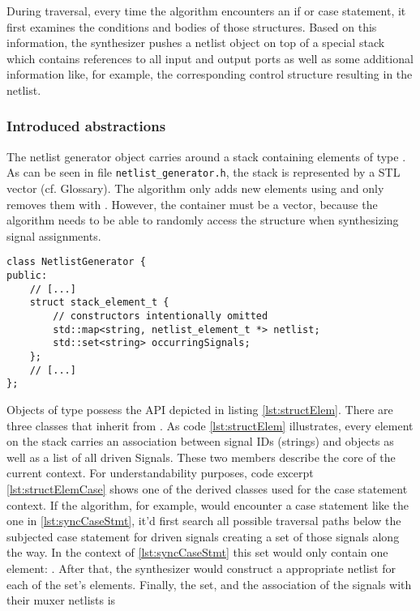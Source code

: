 During traversal, every time the algorithm encounters an if or
case statement, it first examines the conditions and bodies of those
structures. Based on this information, the synthesizer pushes a netlist
object on top of a special stack which contains references to all
input and output ports as well as some additional information like,
for example, the corresponding control structure resulting in the
netlist.

\subsubsection{Introduced abstractions}
The netlist generator object carries around a stack containing
elements of type . As can be seen in file
\texttt{netlist_generator.h},
the stack is represented by a STL vector (cf. Glossary).
The algorithm only adds new elements using  and only
removes them with . However, the container must be a
vector, because the algorithm needs to be able to randomly access the
structure when synthesizing signal assignments.
%
\begin{lstlisting}[style=c++, caption={API of base stack element},
    label={lst:structElem}]
class NetlistGenerator {
public:
    // [...]
    struct stack_element_t {
        // constructors intentionally omitted
        std::map<string, netlist_element_t *> netlist;
        std::set<string> occurringSignals;
    };
    // [...]
};
\end{lstlisting}
%
Objects of type  possess the API depicted in
listing \ref{lst:structElem}. There are three classes that inherit
from . As code \ref{lst:structElem} illustrates,
every element on the stack carries an association between signal IDs
(strings) and  objects as well as a list of all
driven Signals. These two members describe the core of the current
context.
For understandability purposes, code excerpt \ref{lst:structElemCase}
shows one of the derived classes used for the case statement
context. If the algorithm, for example, would encounter a case
statement like the one in \ref{lst:syncCaseStmt}, it'd first search
all possible traversal paths below the subjected case statement for
driven signals creating a set of those signals along the way. In the
context of \ref{lst:syncCaseStmt} this set would only contain one
element: . After that, the synthesizer would construct a
appropriate netlist for each of the set's elements. Finally, the set,
and the association of the signals with their muxer netlists is
